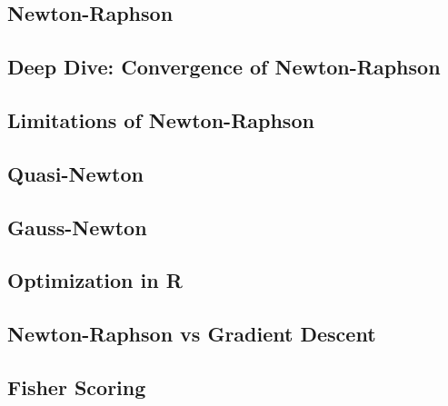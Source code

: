 \subsection{Newton-Raphson}


\subsection{Deep Dive: Convergence of Newton-Raphson}


\subsection{Limitations of Newton-Raphson}


\subsection{Quasi-Newton}


\subsection{Gauss-Newton}


\subsection{Optimization in R}


\subsection{Newton-Raphson vs Gradient Descent}


\subsection{Fisher Scoring}

